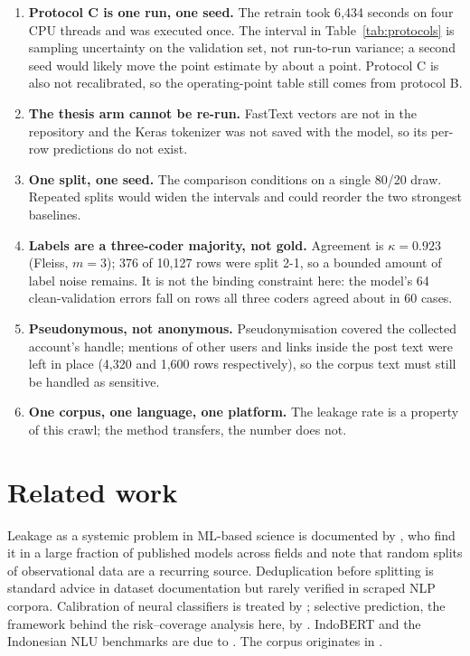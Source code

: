 \documentclass[10pt,a4paper]{article}
\begin{document}
\begin{enumerate}
  \item \textbf{Protocol C is one run, one seed.} The retrain took 6{,}434 seconds on four CPU
  threads and was executed once. The interval in Table~\ref{tab:protocols} is sampling
  uncertainty on the validation set, not run-to-run variance; a second seed would likely move the
  point estimate by about a point. Protocol C is also not recalibrated, so the operating-point
  table still comes from protocol B.
  \item \textbf{The thesis arm cannot be re-run.} FastText vectors are not in the repository and
  the Keras tokenizer was not saved with the model, so its per-row predictions do not exist.
  \item \textbf{One split, one seed.} The comparison conditions on a single 80/20 draw. Repeated
  splits would widen the intervals and could reorder the two strongest baselines.
  \item \textbf{Labels are a three-coder majority, not gold.} Agreement is
  $\kappa=0.923$ (Fleiss, $m=3$); 376 of 10{,}127 rows were split 2-1, so a bounded amount of
  label noise remains. It is not the binding constraint here: the model's 64 clean-validation
  errors fall on rows all three coders agreed about in 60 cases.
  \item \textbf{Pseudonymous, not anonymous.} Pseudonymisation covered the collected account's
  handle; mentions of other users and links inside the post text were left in place (4{,}320 and
  1{,}600 rows respectively), so the corpus text must still be handled as sensitive.
  \item \textbf{One corpus, one language, one platform.} The leakage rate is a property of this
  crawl; the method transfers, the number does not.
\end{enumerate}

\section{Related work}

Leakage as a systemic problem in ML-based science is documented by \citet{kapoor2023leakage}, who
find it in a large fraction of published models across fields and note that random splits of
observational data are a recurring source. Deduplication before splitting is standard advice in
dataset documentation \citep{gebru2021datasheets} but rarely verified in scraped NLP corpora.
Calibration of neural classifiers is treated by \citet{guo2017calibration}; selective prediction,
the framework behind the risk--coverage analysis here, by \citet{geifman2017selective}. IndoBERT
and the Indonesian NLU benchmarks are due to \citet{wilie2020indonlu}. The corpus originates in
\citet{thesis}.
\end{document}
